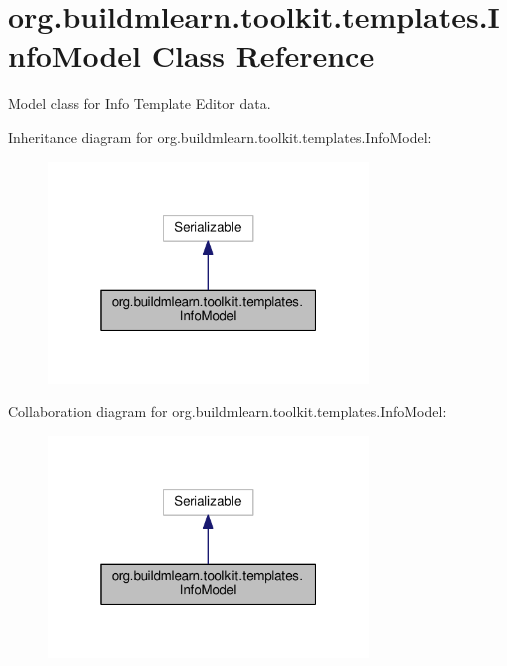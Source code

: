 \hypertarget{classorg_1_1buildmlearn_1_1toolkit_1_1templates_1_1InfoModel}{}\section{org.\+buildmlearn.\+toolkit.\+templates.\+Info\+Model Class Reference}
\label{classorg_1_1buildmlearn_1_1toolkit_1_1templates_1_1InfoModel}


Model class for Info Template Editor data.  




Inheritance diagram for org.\+buildmlearn.\+toolkit.\+templates.\+Info\+Model\+:
\nopagebreak
\begin{figure}[H]
\begin{center}
\leavevmode
\includegraphics[width=241pt]{classorg_1_1buildmlearn_1_1toolkit_1_1templates_1_1InfoModel__inherit__graph}
\end{center}
\end{figure}


Collaboration diagram for org.\+buildmlearn.\+toolkit.\+templates.\+Info\+Model\+:
\nopagebreak
\begin{figure}[H]
\begin{center}
\leavevmode
\includegraphics[width=241pt]{classorg_1_1buildmlearn_1_1toolkit_1_1templates_1_1InfoModel__coll__graph}
\end{center}
\end{figure}
